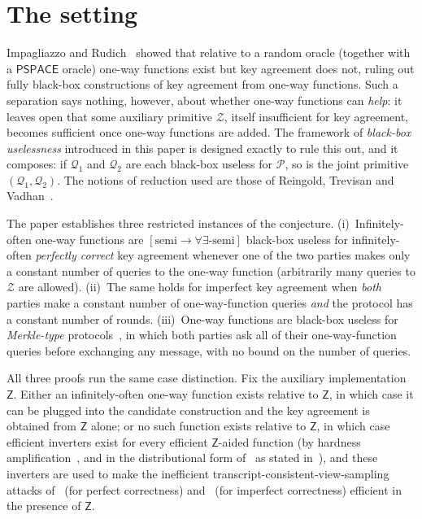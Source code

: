 \documentclass{conjura-conjecture}
\newcommand{\Zc}{\mathcal{Z}}
\newcommand{\Pc}{\mathcal{P}}
\newcommand{\Qc}{\mathcal{Q}}
\newcommand{\semibbu}{[\mathrm{semi}\to\forall\exists\text{-semi}]}
\newcommand{\Zs}{\mathsf{Z}}
\begin{document}
\section{The setting}\label{sec:setting}

Impagliazzo and Rudich~\cite{IR89} showed that relative to a random
oracle (together with a $\mathsf{PSPACE}$ oracle) one-way functions exist
but key agreement does not, ruling out fully black-box constructions of
key agreement from one-way functions. Such a separation says nothing,
however, about whether one-way functions can \emph{help}: it leaves open
that some auxiliary primitive $\Zc$, itself insufficient for key
agreement, becomes sufficient once one-way functions are added. The
framework of \emph{black-box uselessness} introduced in this paper is
designed exactly to rule this out, and it composes: if $\Qc_1$ and
$\Qc_2$ are each black-box useless for $\Pc$, so is the joint primitive
$(\Qc_1,\Qc_2)$. The notions of reduction used are those of Reingold,
Trevisan and Vadhan~\cite{RTV04}.

The paper establishes three restricted instances of the conjecture.
(i)~Infinitely-often one-way functions are $\semibbu$ black-box useless
for infinitely-often \emph{perfectly correct} key agreement whenever one
of the two parties makes only a constant number of queries to the one-way
function (arbitrarily many queries to $\Zc$ are allowed). (ii)~The same
holds for imperfect key agreement when \emph{both} parties make a
constant number of one-way-function queries \emph{and} the protocol has a
constant number of rounds. (iii)~One-way functions are black-box useless
for \emph{Merkle-type} protocols~\cite{Mer78}, in which both parties ask
all of their one-way-function queries before exchanging any message, with
no bound on the number of queries.

All three proofs run the same case distinction. Fix the auxiliary
implementation $\Zs$. Either an infinitely-often one-way function exists
relative to $\Zs$, in which case it can be plugged into the candidate
construction and the key agreement is obtained from $\Zs$ alone; or no
such function exists relative to $\Zs$, in which case efficient inverters
exist for every efficient $\Zs$-aided function (by hardness
amplification~\cite{Yao82}, and in the distributional form
of~\cite{IL89} as stated in~\cite{BHT14}), and these inverters are used
to make the inefficient transcript-consistent-view-sampling attacks
of~\cite{BKSY11} (for perfect correctness) and~\cite{IR89,BM09,BM17}
(for imperfect correctness) efficient in the presence of $\Zs$.
\end{document}
